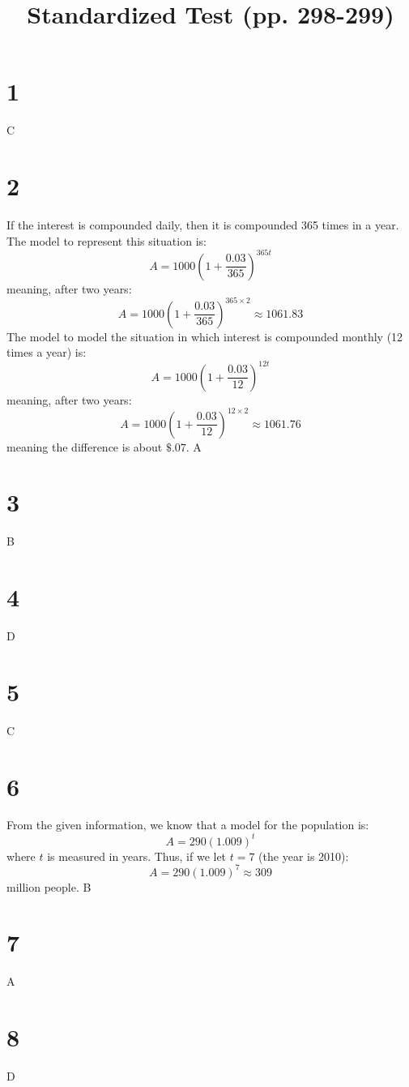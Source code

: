 \documentclass{article}
\title{Standardized Test (pp. 298-299)}
\theoremstyle{definition}
\newcommand{\?}{\stackrel{?}{=}}
\begin{document}
\maketitle

\section*{1}
C

\section*{2}
If the interest is compounded daily, then it is compounded 365 times in a year. The model to represent this situation is:
\[ A=1000(1+\dfrac{0.03}{365})^{365t} \] meaning, after two years:
\[ A=1000(1+\dfrac{0.03}{365})^{365\times 2}\approx 1061.83 \]
The model to model the situation in which interest is compounded monthly (12 times a year) is:
\[ A=1000(1+\dfrac{0.03}{12})^{12t} \] meaning, after two years:
\[ A=1000(1+\dfrac{0.03}{12})^{12\times 2}\approx 1061.76 \]
meaning the difference is about $\$.07$.
\newline A

\section*{3}
B

\section*{4}
D

\section*{5}
C

\section*{6}
From the given information, we know that a model for the population is:
\[ A=290(1.009)^t \] where $t$ is measured in years. Thus, if we let $t=7$ (the year is 2010):
\[ A=290(1.009)^7\approx 309 \] million people.
\newline B

\section*{7}
A

\section*{8}
D
\end{document}
